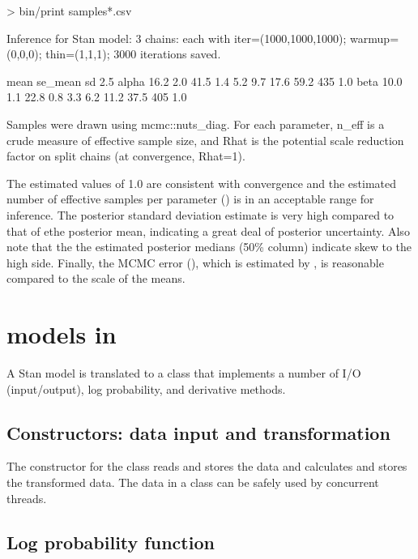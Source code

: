 \documentclass[article]{jss}
\begin{document}
\begin{CodeChunk}
\begin{CodeInput}
> bin/print samples*.csv
\end{CodeInput}
\begin{CodeOutput}
Inference for Stan model: 
3 chains: each with iter=(1000,1000,1000); warmup=(0,0,0); 
thin=(1,1,1); 3000 iterations saved.

       mean se_mean   sd 2.5%
alpha  16.2     2.0 41.5  1.4  5.2  9.7 17.6  59.2   435  1.0
beta   10.0     1.1 22.8  0.8  3.3  6.2 11.2  37.5   405  1.0

Samples were drawn using mcmc::nuts_diag.
For each parameter, n_eff is a crude measure of effective 
sample size, and Rhat is the potential scale reduction factor 
on split chains (at convergence, Rhat=1).
\end{CodeOutput}
\end{CodeChunk}
%
The estimated  values of 1.0 are consistent with
convergence and the estimated number of effective samples per
parameter () is in an acceptable range for inference.
The posterior standard deviation estimate is very high compared to
that of ethe posterior mean, indicating a great deal of posterior
uncertainty.  Also note that the the estimated posterior medians (50\%
column) indicate skew to the high side.  Finally, the MCMC error
(), which is estimated by , 
is reasonable compared to the scale of the means.

\section[Stan models in C++]{ models in }

A Stan model is translated to a  class that implements a
number of I/O (input/output), log probability, and derivative methods.

\subsection{Constructors: data input and transformation} 

The constructor for the class reads and stores the data and calculates
and stores the transformed data.  The data in a class can be safely
used by concurrent threads.

\subsection{Log probability function}
\end{document}
